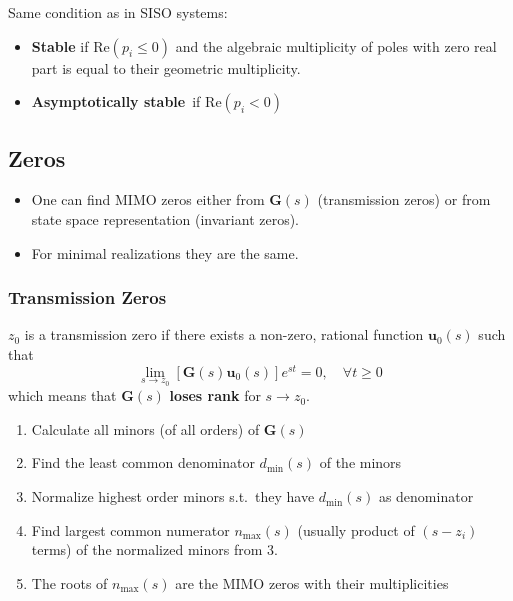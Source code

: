 
\newpar{}

Same condition as in SISO systems:
\begin{itemize}
    \item \textbf{Stable} if $\mathrm{Re}(p_i \le 0)$ and the algebraic multiplicity of poles with zero real part is equal to their geometric multiplicity.
    \item \textbf{Asymptotically stable}\ if $\mathrm{Re}(p_i<0)$
\end{itemize}


\subsection{Zeros}
\begin{itemize}
    \item One can find MIMO zeros either from $\mathbf{G}(s)$ (transmission zeros) or from state space representation (invariant zeros).
    \item For minimal realizations they are the same.
\end{itemize}

\subsubsection{Transmission Zeros}

$z_0$ is a transmission zero if there exists a non-zero, rational function $\mathbf{u}_0(s)$ such that
\begin{equation*}
    \lim_{s\to z_0}\left[\mathbf{G}(s)\mathbf{u}_0(s)\right]e^{st}=0,\quad\forall t\geq0
\end{equation*}
which means that $\mathbf{\mathbf{G}}(s)$ \textbf{loses rank} for $s\to z_0$.


\begin{enumerate}
    \item Calculate all minors (of all orders) of $\mathbf{G}(s)$
    \item Find the least common denominator $d_{\min}(s)$ of the minors
    \item Normalize highest order minors s.t.\ they have $d_{\min}(s)$ as denominator
    \item Find largest common numerator $n_{\max}(s)$ (usually product of $(s-z_i)$ terms) of the normalized minors from 3.
    \item The roots of $n_{\max}(s)$ are the MIMO zeros with their multiplicities
\end{enumerate}

